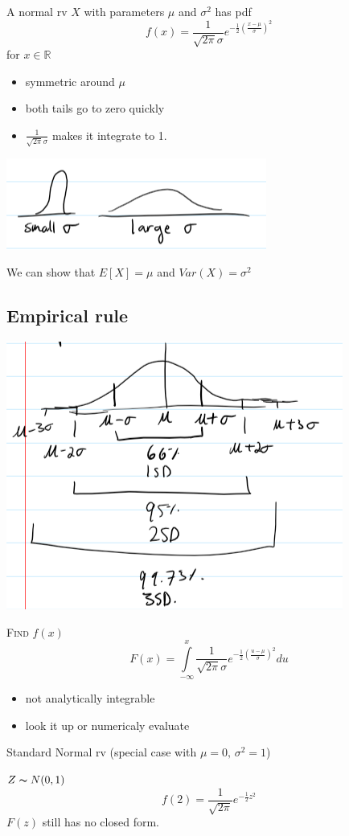 \begin{defbox}
    A normal rv $ X $ with parameters $ \mu $ and $ \sigma^2 $ has pdf
    \[ f(x)=\frac{1}{\sqrt{2\pi}\sigma}e^{-\frac{1}{2}\left(\frac{x-\mu}{\sigma} \right)^2}  \]
    for $ x\in\mathbb{R} $
\end{defbox}
\begin{itemize}
    \item symmetric around $ \mu $
    \item both tails go to zero quickly
    \item $\frac{1}{\sqrt{2\pi}\sigma}$ makes it integrate to 1.
\end{itemize}

\begin{center}
    \includegraphics{sigma.png}
\end{center}
We can show that $ E[X]=\mu $ and $ Var(X)=\sigma^2 $

\subsection{Empirical rule}
\begin{center}
    \includegraphics{emp.png}
\end{center}

\textsc{Find $ f(x) $}
\[ F(x)=\int\limits_{-\infty}^{x} \frac{1}{\sqrt{2\pi}\sigma}e^{-\frac{1}{2}\left(\frac{u-\mu}{\sigma} \right)^2} d{u} \]
\begin{itemize}
    \item not analytically integrable
    \item look it up or numericaly evaluate
\end{itemize}
Standard Normal rv (special case with $ \mu=0,\,\sigma^2=1 $)

$ Z \thicksim N(0,1) $
\[ f(2)=\frac{1}{\sqrt{2\pi}}e^{-\frac{1}{2}z^2} \]
$ F(z) $ still has no closed form.